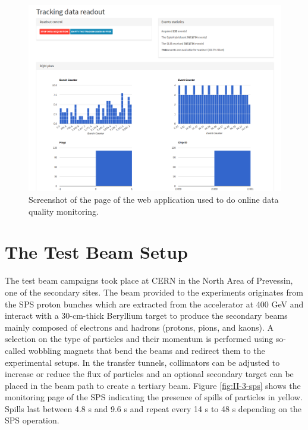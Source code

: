       \begin{figure}[h!]
        \centering
        \includegraphics[width=\textwidth]{img/II-3-test-beam/app-tk.png}
        \caption{Screenshot of the page of the web application used to do online data quality monitoring.}
        \label{fig:II-3-app-tk}
      \end{figure}

  \section{The Test Beam Setup}

    The test beam campaigns took place at CERN in the North Area of Prevessin, one of the secondary sites. The beam provided to the experiments originates from the SPS proton bunches which are extracted from the accelerator at 400 GeV and interact with a 30-cm-thick Beryllium target to produce the secondary beams mainly composed of electrons and hadrons (protons, pions, and kaons). A selection on the type of particles and their momentum is performed using so-called wobbling magnets that bend the beams and redirect them to the experimental setups. In the transfer tunnels, collimators can be adjusted to increase or reduce the flux of particles and an optional secondary target can be placed in the beam path to create a tertiary beam. Figure \ref{fig:II-3-sps} shows the monitoring page of the SPS indicating the presence of spills of particles in yellow. Spills last between 4.8 s and 9.6 s and repeat every 14 s to 48 s depending on the SPS operation. \\

